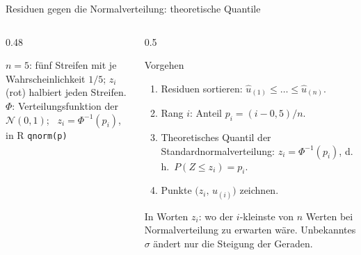 \documentclass[aspectratio=169,11pt]{beamer}
\begin{document}
\begin{frame}{Residuen gegen die Normalverteilung: theoretische Quantile}
  \begin{columns}[T]
    \begin{column}{0.48\textwidth}
      \par
      {\centering\footnotesize
        $n = 5$: fünf Streifen mit je Wahrscheinlichkeit $1/5$;
        $z_i$ (rot) halbiert jeden Streifen.\\ $\Phi$: Verteilungsfunktion
        der $\mathcal{N}(0, 1)$; \ $z_i = \Phi^{-1}(p_i)$, in R \texttt{qnorm(p)}\par}
    \end{column}
    \begin{column}{0.5\textwidth}
      \small
      \begin{block}{Vorgehen}
        \begin{enumerate}
          \item Residuen sortieren: $\hat{u}_{(1)} \le \ldots \le \hat{u}_{(n)}$.
          \item Rang $i$: Anteil $p_i = (i - 0{,}5)/n$.
          \item Theoretisches Quantil der Standardnormalverteilung:
                $z_i = \Phi^{-1}(p_i)$, d.\,h.\ $P(Z \le z_i) = p_i$.
          \item Punkte $\bigl(z_i,\,\hat{u}_{(i)}\bigr)$ zeichnen.
        \end{enumerate}
      \end{block}
      \begin{exampleblock}{In Worten}
        $z_i$: wo der $i$-kleinste von $n$ Werten bei Normalverteilung
        \glqq zu erwarten\grqq{} wäre. Unbekanntes $\sigma$ ändert nur die
        Steigung der Geraden.
      \end{exampleblock}
    \end{column}
  \end{columns}
\end{frame}
\end{document}
